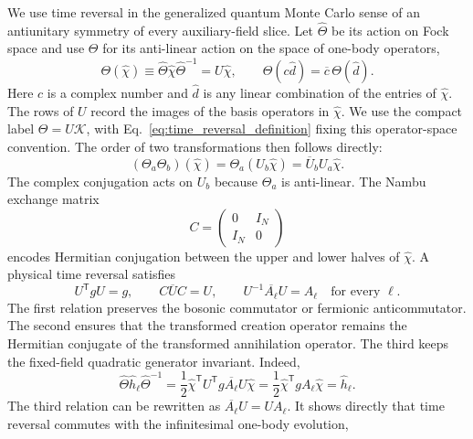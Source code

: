 \documentclass[onecolumn,aps,prb,amsmath,amssymb,superscriptaddress,longbibliography]{revtex4-2}
\newcommand{\trans}{\mathsf{T}}
\newcommand{\mc}[1]{\mathcal{#1}}
\begin{document}
We use time reversal in the generalized quantum Monte Carlo sense of an antiunitary symmetry of every auxiliary-field slice.  Let \(\widehat\Theta\) be its action on Fock space and use \(\Theta\) for its anti-linear action on the space of one-body operators,
\begin{equation}
    \Theta(\hat\chi)
    \equiv\widehat\Theta\hat\chi\widehat\Theta^{-1}
    =U\hat\chi,
    \qquad
    \Theta(c\hat d)=\overline c\,\Theta(\hat d).
    \label{eq:time_reversal_definition}
\end{equation}
Here \(c\) is a complex number and \(\hat d\) is any linear combination of the entries of \(\hat\chi\).  The rows of \(U\) record the images of the basis operators in \(\hat\chi\).  We use the compact label \(\Theta=U\mc K\), with Eq.~\eqref{eq:time_reversal_definition} fixing this operator-space convention.  The order of two transformations then follows directly:
\begin{equation}
    (\Theta_a\Theta_b)(\hat\chi)
    =\Theta_a(U_b\hat\chi)
    =\overline U_bU_a\hat\chi.
    \label{eq:TR_composition_order}
\end{equation}
The complex conjugation acts on \(U_b\) because \(\Theta_a\) is anti-linear.  The Nambu exchange matrix
\begin{equation}
    C=\begin{pmatrix}0&I_N\\ I_N&0\end{pmatrix}
    \label{eq:C_matrix}
\end{equation}
encodes Hermitian conjugation between the upper and lower halves of \(\hat\chi\).  A physical time reversal satisfies
\begin{equation}
    U^\trans gU=g,
    \qquad
    C\overline U C=U,
    \qquad
    U^{-1}\overline{A_\ell}U=A_\ell
    \quad\text{for every }\ell .
    \label{eq:physical_TR_conditions}
\end{equation}
The first relation preserves the bosonic commutator or fermionic anticommutator.  The second ensures that the transformed creation operator remains the Hermitian conjugate of the transformed annihilation operator.  The third keeps the fixed-field quadratic generator invariant.  Indeed,
\begin{equation}
    \widehat\Theta\hat h_\ell\widehat\Theta^{-1}
    =\frac12\hat\chi^\trans U^\trans g\overline{A_\ell}U\hat\chi
    =\frac12\hat\chi^\trans gA_\ell\hat\chi
    =\hat h_\ell .
    \label{eq:TR_invariance_derivation}
\end{equation}
The third relation can be rewritten as \(\overline{A_\ell}U=UA_\ell\).  It shows directly that time reversal commutes with the infinitesimal one-body evolution,
\end{document}
